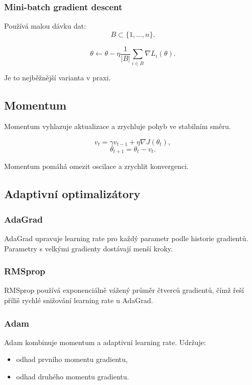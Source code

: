 \subsubsection{Mini-batch gradient descent}

Používá malou dávku dat:
\[
B\subset \{1,\ldots,n\}.
\]

\[
\theta
\leftarrow
\theta
-
\eta
\frac{1}{|B|}
\sum_{i\in B}
\nabla L_i(\theta).
\]

Je to nejběžnější varianta v praxi.

\subsection{Momentum}

Momentum vyhlazuje aktualizace a zrychluje pohyb ve stabilním směru.

\[
v_t
=
\gamma v_{t-1}
+
\eta \nabla J(\theta_t),
\]
\[
\theta_{t+1}
=
\theta_t-v_t.
\]

Momentum pomáhá omezit oscilace a zrychlit konvergenci.

\subsection{Adaptivní optimalizátory}

\subsubsection{AdaGrad}

AdaGrad upravuje learning rate pro každý parametr podle historie gradientů. Parametry s velkými gradienty
dostávají menší kroky.

\subsubsection{RMSprop}

RMSprop používá exponenciálně vážený průměr čtverců gradientů, čímž řeší příliš rychlé snižování learning
rate u AdaGrad.

\subsubsection{Adam}

Adam kombinuje momentum a adaptivní learning rate. Udržuje:
\begin{itemize}
    \item odhad prvního momentu gradientu,
    \item odhad druhého momentu gradientu.
\end{itemize}

